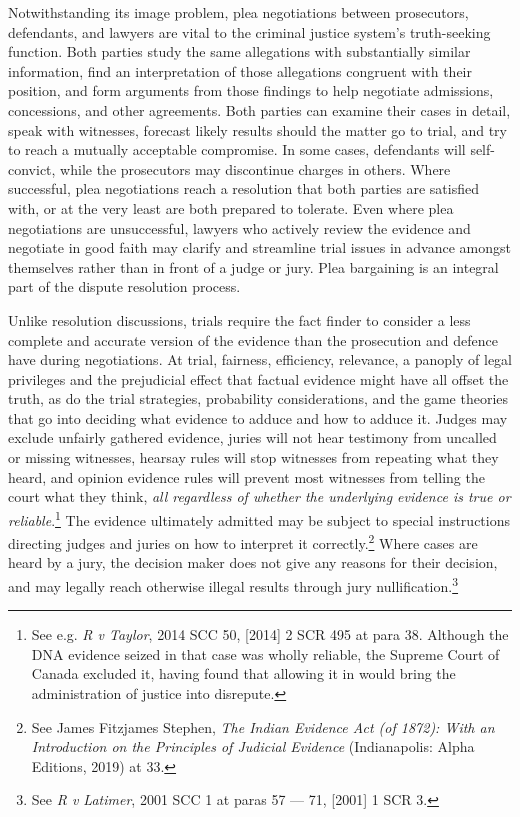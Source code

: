 Notwithstanding its image problem, plea negotiations between prosecutors, defendants, and lawyers are vital to the criminal justice system's truth-seeking function. Both parties study the same allegations with substantially similar information, find an interpretation of those allegations congruent with their position, and form arguments from those findings to help negotiate admissions, concessions, and other agreements. Both parties can examine their cases in detail, speak with witnesses, forecast likely results should the matter go to trial, and try to reach a mutually acceptable compromise. In some cases, defendants will self-convict, while the prosecutors may discontinue charges in others. Where successful, plea negotiations reach a resolution that both parties are satisfied with, or at the very least are both prepared to tolerate. Even where plea negotiations are unsuccessful, lawyers who actively review the evidence and negotiate in good faith may clarify and streamline trial issues in advance amongst themselves rather than in front of a judge or jury. Plea bargaining is an integral part of the dispute resolution process.

Unlike resolution discussions, trials require the fact finder to consider a less complete and accurate version of the evidence than the prosecution and defence have during negotiations. At trial, fairness, efficiency, relevance, a panoply of legal privileges and the prejudicial effect that factual evidence might have all offset the truth, as do the trial strategies, probability considerations, and the game theories that go into deciding what evidence to adduce and how to adduce it. Judges may exclude unfairly gathered evidence, juries will not hear testimony from uncalled or missing witnesses, hearsay rules will stop witnesses from repeating what they heard, and opinion evidence rules will prevent most witnesses from telling the court what they think, \textit{all regardless of whether the underlying evidence is true or reliable}.\footnote{See e.g. \textit{R v Taylor}, 2014 SCC 50, [2014] 2 SCR 495 at para 38. Although the DNA evidence seized in that case was wholly reliable, the Supreme Court of Canada excluded it, having found that allowing it in would bring the administration of justice into disrepute.} The evidence ultimately admitted may be subject to special instructions directing judges and juries on how to interpret it correctly.\footnote{See James Fitzjames Stephen, \textit{The Indian Evidence Act (of 1872): With an Introduction on the Principles of Judicial Evidence} (Indianapolis: Alpha Editions, 2019) at 33.} Where cases are heard by a jury, the decision maker does not give any reasons for their decision, and may legally reach otherwise illegal results through jury nullification.\footnote{See \textit{R v Latimer}, 2001 SCC 1 at paras 57 — 71, [2001] 1 SCR 3.}

